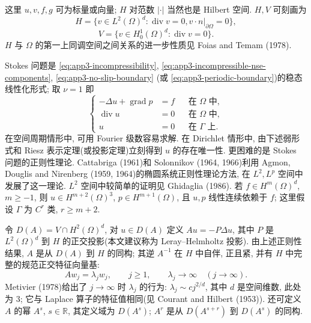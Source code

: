 \hypertarget{appendix-03-page-357}{}
这里 $u,v,f,g$ 可为标量或向量; $H$ 对范数 $|\cdot|$ 当然也是 Hilbert 空间. $H,V$ 可刻画为
\[
H=\{v\in L^2(\Omega)^d:\operatorname{div}v=0, v\cdot n|_{\partial\Omega}=0\},
\]
\[
V=\{v\in H_0^1(\Omega)^d:\operatorname{div}v=0\}.
\]
$H$ 与 $\Omega$ 的第一上同调空间之间关系的进一步性质见 Foias and Temam (1978).

Stokes 问题是 
\eqref{eq:app3-incompressibility}, 
\eqref{eq:app3-incompressible-nse-components}, 
\eqref{eq:app3-no-slip-boundary} (或 
\eqref{eq:app3-periodic-boundary})的稳态线性化形式; 取 $\nu=1$ 即
\begin{equation}
\left\{
\begin{aligned}
-\Delta u+\operatorname{grad}p&=f&&\text{在 }\Omega\text{ 中},\\
\operatorname{div}u&=0&&\text{在 }\Omega\text{ 中},\\
u&=0&&\text{在 }\Gamma\text{ 上}.
\end{aligned}
\right.
\label{eq:app3-stokes-problem}
\end{equation}
在空间周期情形中, 可用 Fourier 级数容易求解. 在 Dirichlet 情形中, 由下述弱形式和 Riesz 表示定理(或投影定理)立刻得到 $u$ 的存在唯一性. 更困难的是 Stokes 问题的正则性理论. Cattabriga (1961)和 Solonnikov (1964, 1966)利用 Agmon, Douglis and Nirenberg (1959, 1964)的椭圆系统正则性理论方法, 在 $L^2,L^p$ 空间中发展了这一理论. $L^2$ 空间中较简单的证明见 Ghidaglia (1986). 若 $f\in H^m(\Omega)^d$, $m\geq-1$, 则 $u\in H^{m+2}(\Omega)^3$, $p\in H^{m+1}(\Omega)$, 且 $u,p$ 线性连续依赖于 $f$; 这里假设 $\Gamma$ 为 $C^r$ 类, $r\geq m+2$.

令 $D(A)=V\cap H^2(\Omega)^d$, 对 $u\in D(A)$ 定义 $Au=-P\Delta u$, 其中 $P$ 是 $L^2(\Omega)^d$ 到 $H$ 的正交投影(本文建议称为 Leray--Helmholtz 投影). 由上述正则性结果, $A$ 是从 $D(A)$ 到 $H$ 的同构; 其逆 $A^{-1}$ 在 $H$ 中自伴, 正且紧, 并有 $H$ 中完整的规范正交特征向量基:
\[
Aw_j=\lambda_jw_j,
\qquad j\geq1,
\qquad \lambda_j\to\infty\quad(j\to\infty).
\]
Metivier (1978)给出了 $j\to\infty$ 时 $\lambda_j$ 的行为: $\lambda_j\sim c j^{2/d}$, 其中 $d$ 是空间维数, 此处为 $3$; 它与 Laplace 算子的特征值相同(见 Courant and Hilbert (1953)). 还可定义 $A$ 的幂 $A^s$, $s\in\mathbb R$, 其定义域为 $D(A^s)$; $A^r$ 是从 $D(A^{s+r})$ 到 $D(A^s)$ 的同构.

